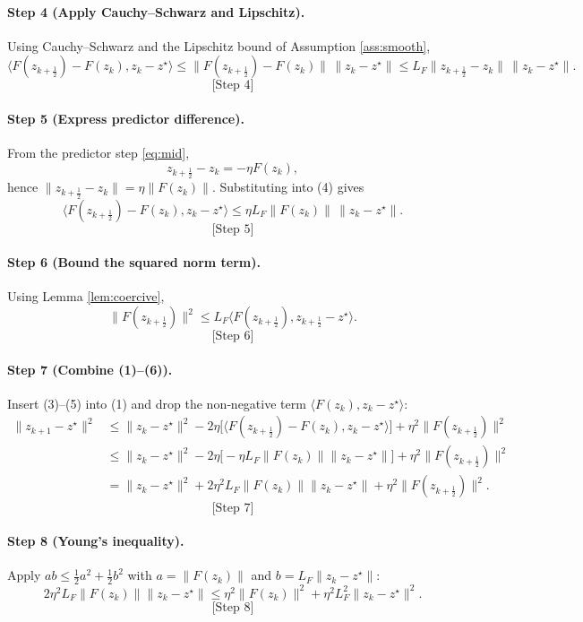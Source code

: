 \documentclass{article}
\begin{document}
\paragraph{Step 4 (Apply Cauchy–Schwarz and Lipschitz).}
Using Cauchy–Schwarz and the Lipschitz bound of Assumption \ref{ass:smooth},
\[
\langle F(z_{k+\frac12})-F(z_{k}),z_{k}-z^{\star}\rangle
\le \|F(z_{k+\frac12})-F(z_{k})\|\,\|z_{k}-z^{\star}\|
\le L_{F}\|z_{k+\frac12}-z_{k}\|\,\|z_{k}-z^{\star}\|.
\tag{4}
\]
\[
\text{[Step 4]}
\]

\paragraph{Step 5 (Express predictor difference).}
From the predictor step \eqref{eq:mid},
\[
z_{k+\frac12}-z_{k}= -\eta F(z_{k}),
\]
hence $\|z_{k+\frac12}-z_{k}\| = \eta\|F(z_{k})\|$. Substituting into (4) gives
\[
\langle F(z_{k+\frac12})-F(z_{k}),z_{k}-z^{\star}\rangle
\le \eta L_{F}\|F(z_{k})\|\,\|z_{k}-z^{\star}\|.
\tag{5}
\]
\[
\text{[Step 5]}
\]

\paragraph{Step 6 (Bound the squared norm term).}
Using Lemma \ref{lem:coercive},
\[
\|F(z_{k+\frac12})\|^{2}
\le L_{F}\langle F(z_{k+\frac12}),z_{k+\frac12}-z^{\star}\rangle .
\tag{6}
\]
\[
\text{[Step 6]}
\]

\paragraph{Step 7 (Combine (1)–(6)).}
Insert (3)–(5) into (1) and drop the non‑negative term $\langle F(z_{k}),z_{k}-z^{\star}\rangle$:
\[
\begin{aligned}
\|z_{k+1}-z^{\star}\|^{2}
&\le \|z_{k}-z^{\star}\|^{2}
-2\eta\bigl[\langle F(z_{k+\frac12})-F(z_{k}),z_{k}-z^{\star}\rangle\bigr]
+\eta^{2}\|F(z_{k+\frac12})\|^{2}\\
&\le \|z_{k}-z^{\star}\|^{2}
-2\eta\bigl[-\eta L_{F}\|F(z_{k})\|\|z_{k}-z^{\star}\|\bigr]
+\eta^{2}\|F(z_{k+\frac12})\|^{2}\\
&= \|z_{k}-z^{\star}\|^{2}
+2\eta^{2}L_{F}\|F(z_{k})\|\|z_{k}-z^{\star}\|
+\eta^{2}\|F(z_{k+\frac12})\|^{2}.
\end{aligned}
\tag{7}
\]
\[
\text{[Step 7]}
\]

\paragraph{Step 8 (Young’s inequality).}
Apply $ab\le\frac{1}{2}a^{2}+\frac{1}{2}b^{2}$ with $a=\|F(z_{k})\|$ and $b=L_{F}\|z_{k}-z^{\star}\|$:
\[
2\eta^{2}L_{F}\|F(z_{k})\|\|z_{k}-z^{\star}\|
\le \eta^{2}\|F(z_{k})\|^{2}+\eta^{2}L_{F}^{2}\|z_{k}-z^{\star}\|^{2}.
\tag{8}
\]
\[
\text{[Step 8]}
\]
\end{document}
